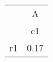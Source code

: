 \begin{tabular}{l*{1}{c}}
\hline\hline
            &           A\\
            &          c1\\
\hline
r1          &        0.17\\
\hline\hline
\end{tabular}
